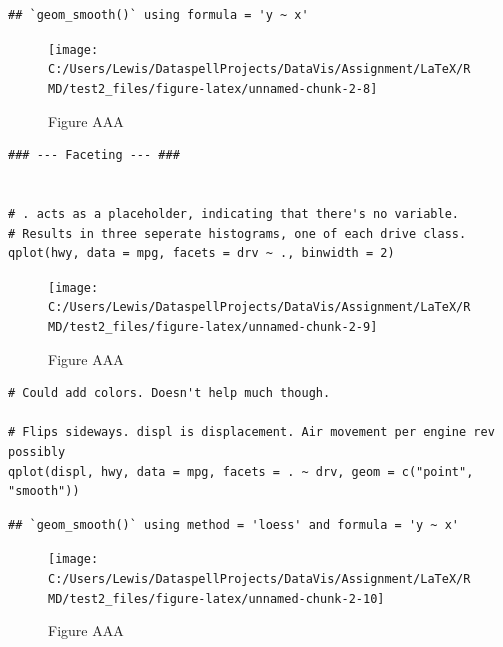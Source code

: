 \begin{verbatim}
## `geom_smooth()` using formula = 'y ~ x'
\end{verbatim}

\begin{figure}[H]

{\centering \texttt{[image: C:/Users/Lewis/DataspellProjects/DataVis/Assignment/LaTeX/RMD/test2\_files/figure-latex/unnamed-chunk-2-8]} 

}

\caption{Figure AAA}\label{fig:unnamed-chunk-2-8}
\end{figure}

\begin{verbatim}
### --- Faceting --- ###


# . acts as a placeholder, indicating that there's no variable.
# Results in three seperate histograms, one of each drive class.
qplot(hwy, data = mpg, facets = drv ~ ., binwidth = 2)
\end{verbatim}

\begin{figure}[H]

{\centering \texttt{[image: C:/Users/Lewis/DataspellProjects/DataVis/Assignment/LaTeX/RMD/test2\_files/figure-latex/unnamed-chunk-2-9]} 

}

\caption{Figure AAA}\label{fig:unnamed-chunk-2-9}
\end{figure}

\begin{verbatim}
# Could add colors. Doesn't help much though.

# Flips sideways. displ is displacement. Air movement per engine rev possibly
qplot(displ, hwy, data = mpg, facets = . ~ drv, geom = c("point", "smooth"))
\end{verbatim}

\begin{verbatim}
## `geom_smooth()` using method = 'loess' and formula = 'y ~ x'
\end{verbatim}

\begin{figure}[H]

{\centering \texttt{[image: C:/Users/Lewis/DataspellProjects/DataVis/Assignment/LaTeX/RMD/test2\_files/figure-latex/unnamed-chunk-2-10]} 

}

\caption{Figure AAA}\label{fig:unnamed-chunk-2-10}
\end{figure}

